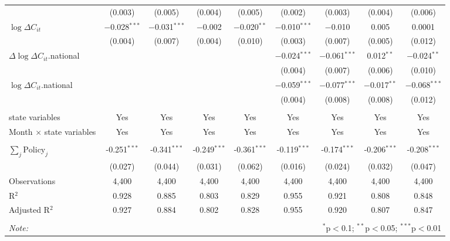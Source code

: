 \begin{tabular}{@{\extracolsep{1pt}}lcccccccc}
  & (0.003) & (0.005) & (0.004) & (0.005) & (0.002) & (0.003) & (0.004) & (0.006) \\ 
  $\log \Delta C_{it}$ & $-$0.028$^{***}$ & $-$0.031$^{***}$ & $-$0.002 & $-$0.020$^{**}$ & $-$0.010$^{***}$ & $-$0.010 & 0.005 & 0.0001 \\ 
  & (0.004) & (0.007) & (0.004) & (0.010) & (0.003) & (0.007) & (0.005) & (0.012) \\ 
  $\Delta \log \Delta C_{it}$.national &  &  &  &  & $-$0.024$^{***}$ & $-$0.061$^{***}$ & 0.012$^{**}$ & $-$0.024$^{**}$ \\ 
  &  &  &  &  & (0.004) & (0.007) & (0.006) & (0.010) \\ 
  $\log \Delta C_{it}$.national &  &  &  &  & $-$0.059$^{***}$ & $-$0.077$^{***}$ & $-$0.017$^{**}$ & $-$0.068$^{***}$ \\ 
  &  &  &  &  & (0.004) & (0.008) & (0.008) & (0.012) \\ 
 \hline \\[-1.8ex] 
state variables & Yes & Yes & Yes & Yes & Yes & Yes & Yes & Yes \\ 
Month $\times$ state variables & Yes & Yes & Yes & Yes & Yes & Yes & Yes & Yes \\ 
\hline \\[-1.8ex] 
$\sum_j \mathrm{Policy}_j$ & -0.251$^{***}$ & -0.341$^{***}$ & -0.249$^{***}$ & -0.361$^{***}$ & -0.119$^{***}$ & -0.174$^{***}$ & -0.206$^{***}$ & -0.208$^{***}$ \\ 
 & (0.027) & (0.044) & (0.031) & (0.062) & (0.016) & (0.024) & (0.032) & (0.047) \\ 
Observations & 4,400 & 4,400 & 4,400 & 4,400 & 4,400 & 4,400 & 4,400 & 4,400 \\ 
R$^{2}$ & 0.928 & 0.885 & 0.803 & 0.829 & 0.955 & 0.921 & 0.808 & 0.848 \\ 
Adjusted R$^{2}$ & 0.927 & 0.884 & 0.802 & 0.828 & 0.955 & 0.920 & 0.807 & 0.847 \\ 
\hline 
\hline \\[-1.8ex] 
\textit{Note:}  & \multicolumn{8}{r}{$^{*}$p$<$0.1; $^{**}$p$<$0.05; $^{***}$p$<$0.01} \\ 
\end{tabular} 